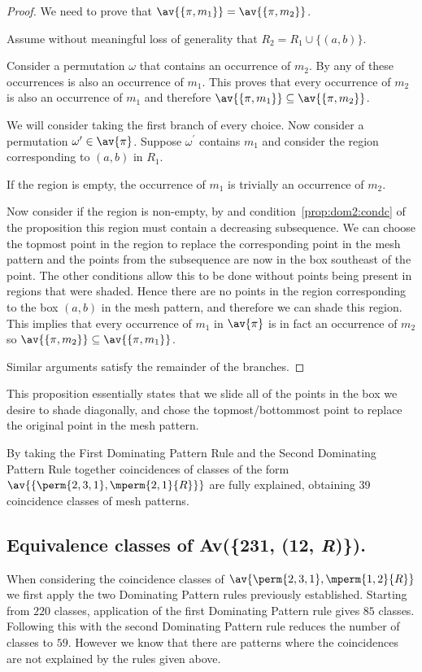 \begin{proof}
    We need to prove that \(\av{\{\pi,m_1\}} = \av{\{\pi,m_2\}}\).

    \noindent Assume without meaningful loss of generality that \(R_2 = R_1 \cup \{(a,b)\}\).

    Consider a permutation \(\omega\) that contains an occurrence of \(m_2\).
    By  any of these occurrences is also an occurrence
    of \(m_1\). This proves that every occurrence of \(m_2\) is also an
    occurrence of \(m_1\) and therefore \(\av{\{\pi,m_1\}} \subseteq \av{\{\pi,m_2\}}\).

    We will consider taking the first branch of every choice.
    Now consider a permutation \(\omega^\prime \in \av{\pi}\). Suppose
    \(\omega^\prime\) contains \(m_1\) and consider the region corresponding to
    \((a,b)\) in \(R_1\).

    If the region is empty, the occurrence of \(m_1\) is trivially an occurrence
    of \(m_2\).

    Now consider if the region is non-empty, by  and
    condition~\ref{prop:dom2:condc} of the proposition this region must contain
    a decreasing subsequence.
    We can choose the topmost point in the region to replace the corresponding
    point in the mesh pattern and the points from the subsequence are now in
    the box southeast of the point. The other conditions allow this to be done
    without points being present in regions that were shaded. Hence there are no
    points in the region corresponding to the box \((a,b)\) in the mesh
    pattern, and therefore we can shade this region. This implies that every
    occurrence of \(m_1\) in \(\av{\pi}\) is in fact an occurrence of \(m_2\)
    so \(\av{\{\pi,m_2\}} \subseteq \av{\{\pi,m_1\}}\).

    Similar arguments satisfy the remainder of the branches.
\end{proof}

This proposition essentially states that we slide all of the points in the box we desire
to shade diagonally, and chose the topmost/bottommost point to replace the original
point in the mesh pattern.

By taking the First Dominating Pattern Rule and the Second Dominating Pattern
Rule together coincidences of classes of the form \(\av{\{\perm{2,3,1},\mperm{2,1}{R}\}}\)
are fully explained, obtaining 39 coincidence classes of mesh patterns.

\subsection{Equivalence classes of Av(\{231, (12, \textit{R})\}).}
When considering the coincidence classes of \(\av{\perm{2,3,1},\mperm{1,2}{R}}\)
we first apply the two Dominating Pattern rules previously established.
Starting from \(220\) classes, application of the first Dominating Pattern rule
gives \(85\) classes. Following this with the second Dominating Pattern rule
reduces the number of classes to \(59\). However we know that there are patterns
where the coincidences are not explained by the rules given above.

